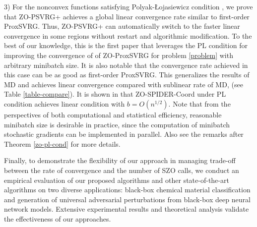 \documentclass{article}
\theoremstyle{definition}
\theoremstyle{remark}
\begin{document}
{\color{Violet}
3) For the nonconvex functions satisfying Polyak-Łojasiewicz condition \cite{polyak1963gradient}, we prove that ZO-PSVRG+
achieves a global linear convergence rate similar to first-order ProxSVRG. Thus, ZO-PSVRG+ can automatically switch to
the faster linear convergence in some regions without restart and algorithmic modification. To the best of
our knowledge, this is the first paper that leverages the PL condition for improving the convergence of of ZO-ProxSVRG for problem \eqref{problem} with arbitrary minibatch size. It is also notable that the convergence rate achieved in this case can be as good as first-order ProxSVRG. This generalizes the results of MD \cite{duchi2015optimal} and  achieves linear convergence compared with sublinear rate of MD, (see Table \ref{table-compare}).
It is shown in \cite{ji2019improved} that  ZO-SPIDER-Coord under PL condition achieves linear condition with $b = O(n^{1/2})$.  
{\color{Violet} Note that from the perspectives of both computational and statistical efficiency, reasonable minibatch size is desirable in practice, since the computation of minibatch stochastic gradients can be
implemented in parallel. 
} Also see the remarks after Theorem \ref{zo-pl-cond} for more details. {\color{RubineRed}

}
}


{\color{Brown}
 Finally, to demonstrate the flexibility of our approach in managing trade-off between the rate of convergence and the number of SZO calls, we conduct an
empirical evaluation of our proposed algorithms and other state-of-the-art algorithms on two diverse
applications: black-box chemical material classification and generation of universal adversarial
perturbations from black-box deep neural network models. Extensive experimental results and
theoretical analysis validate the effectiveness of our approaches.
}
\end{document}
